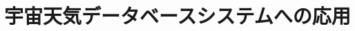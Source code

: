 \documentclass[a4paper,11pt]{ltjsarticle}
\begin{document}
\clearpage
\section{宇宙天気データベースシステムへの応用}







\clearpage


\clearpage



\clearpage



\clearpage
\appendix

\end{document}
